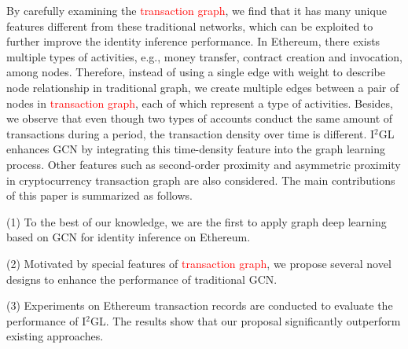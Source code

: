 
 By carefully examining the \textcolor{red}{transaction graph}, we find that it has many unique features different from these traditional networks, which can be exploited to further improve the identity inference performance. In Ethereum, there exists multiple types of activities, e.g., money transfer, contract creation and invocation, among nodes. Therefore, instead of using a single edge with weight to describe node relationship in traditional graph, we create multiple edges between a pair of nodes in \textcolor{red}{transaction graph}, each of which represent a type of activities. Besides, we observe that even though two types of accounts conduct the same amount of transactions during a period, the transaction density over time is different. I$^2$GL enhances GCN by integrating this time-density feature into the graph learning process. Other features such as second-order proximity and asymmetric proximity in cryptocurrency transaction graph are also considered. The main contributions of this paper is summarized as follows.

(1) To the best of our knowledge, we are the first to apply graph deep learning based on GCN for identity inference on Ethereum. 

(2) Motivated by special features of \textcolor{red}{transaction graph}, we propose several novel designs to enhance the performance of traditional GCN.

(3) Experiments on Ethereum transaction records are conducted to evaluate the performance of I$^2$GL. The results show that our proposal significantly outperform existing approaches.

